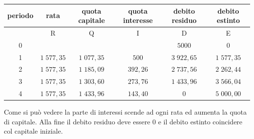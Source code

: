 \begin{exrig}
\begin{esempio}
\begin{tabular}{c|c|c|c|c|c} \hline periodo & rata & quota capitale & quota 
interesse & debito residuo & debito estinto\\ \hline & R & Q & I & D & E\\ 
\hline 0 &  &  &  & $5000$ & $0$\\ 1 & $1\;577,35$ & $1\;077,35$ & $500$ & 
$3\;922,65$ & $1\;577,35$\\ 2 & $1\;577,35$ & $1\;185,09$& $392,26$ & 
$2\;737,56$ & $2\;262,44$\\ 3 & $1\;577,35$ & $1\;303,60$ & $273,76$ & 
$1\;433,96$ & $3\;566,04$\\ 4 & $1\;577,35$ & $1\;433,96$ & $143,40$ & $0$ & 
$5\;000,00$\\ \hline \end{tabular} Come si può vedere la parte di interessi 
scende ad ogni rata ed aumenta la quota di capitale. Alla fine il debito residuo 
deve essere 0 e il debito estinto coincidere col capitale iniziale. 

\end{esempio} \end{exrig}

